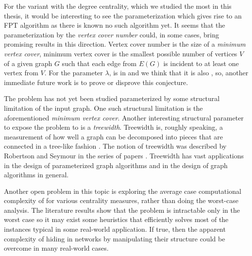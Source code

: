 For the variant with the degree centrality, which we studied the most in this thesis,
it would be interesting to see the parameterization which gives rise to an FPT algorithm
as there is known no such algorithm yet.
It seems that the parameterization by the \emph{vertex cover number} could, in some cases,
bring promising results in this direction.
Vertex cover number is the size of a \emph{minimum vertex cover},
minimum vertex cover is the smallest possible number of vertices $V$ of a given graph $G$ such that each edge from $E(G)$ is incident
to at least one vertex from $V$.
For the parameter $\lambda$, \HLdeg is in \XP and
we think that it is also \Wh, so, another immediate future work is to prove or disprove this conjecture.

The \HL problem has not yet been studied parameterized by some structural limitation of the input graph.
One such structural limitation is the aforementioned \emph{minimum vertex cover}.
Another interesting structural parameter to expose the problem to is a \emph{treewidth}.
Treewidth is, roughly speaking, a measurement of how well a graph can be decomposed into pieces that are connected in a
tree-like fashion \cite[p.~151]{Cygan2015}.
The notion of treewidth was described by Robertson and Seymour in the series of papers \cite{Robertson1984,Robertson1986.2,Robertson1986.5}. 
Treewidth has vast applications in the design of parameterized graph algorithms and
in the design of graph algorithms in general.

Another open problem in this topic is exploring the average case computational complexity of \HL for various centrality measures,
rather than doing the worst-case analysis.
The literature results show that the problem is intractable only in the worst case so
it may exist some heuristics that efficiently solves most of the instances typical in some real-world application.
If true, then the apparent complexity of hiding in networks by manipulating their structure
could be overcome in many real-world cases.~\cite{Dey2019}
